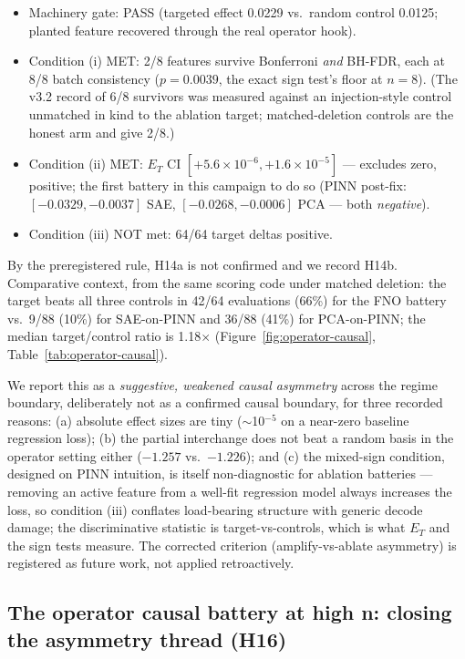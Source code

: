 \documentclass{article}
\newcommand{\ET}{E_T}
\begin{document}
\begin{itemize}
  \item Machinery gate: PASS (targeted effect 0.0229 vs.\ random control
        0.0125; planted feature recovered through the real operator hook).
  \item Condition (i) MET: 2/8 features survive Bonferroni \emph{and}
        BH-FDR, each at 8/8 batch consistency ($p = 0.0039$, the exact
        sign test's floor at $n{=}8$). (The v3.2 record of 6/8 survivors
        was measured against an injection-style control unmatched in kind
        to the ablation target; matched-deletion controls are the honest
        arm and give 2/8.)
  \item Condition (ii) MET: $\ET$ CI $[+5.6\times10^{-6}, +1.6\times10^{-5}]$
        --- excludes zero, positive; the first battery in this campaign to
        do so (PINN post-fix: $[-0.0329, -0.0037]$ SAE, $[-0.0268, -0.0006]$
        PCA --- both \emph{negative}).
  \item Condition (iii) NOT met: 64/64 target deltas positive.
\end{itemize}

By the preregistered rule, H14a is not confirmed and we record H14b.
Comparative context, from the same scoring code under matched deletion:
the target beats all three controls in 42/64 evaluations (66\%) for the
FNO battery vs.\ 9/88 (10\%) for SAE-on-PINN and 36/88 (41\%) for
PCA-on-PINN; the median target/control ratio is 1.18$\times$
(Figure~\ref{fig:operator-causal}, Table~\ref{tab:operator-causal}).

We report this as a \emph{suggestive, weakened causal asymmetry} across
the regime boundary, deliberately not as a confirmed causal boundary, for
three recorded reasons: (a) absolute effect sizes are tiny ($\sim$10$^{-5}$
on a near-zero baseline regression loss); (b) the partial interchange does
not beat a random basis in the operator setting either ($-1.257$ vs.\
$-1.226$); and (c) the mixed-sign condition, designed on PINN intuition,
is itself non-diagnostic for ablation batteries --- removing an active
feature from a well-fit regression model always increases the loss, so
condition (iii) conflates load-bearing structure with generic decode
damage; the discriminative statistic is target-vs-controls, which is what
$\ET$ and the sign tests measure. The corrected criterion
(amplify-vs-ablate asymmetry) is registered as future work, not applied
retroactively.

\subsection{The operator causal battery at high n: closing the asymmetry thread (H16)}
\label{sec:operator-causal-highn}
\end{document}
